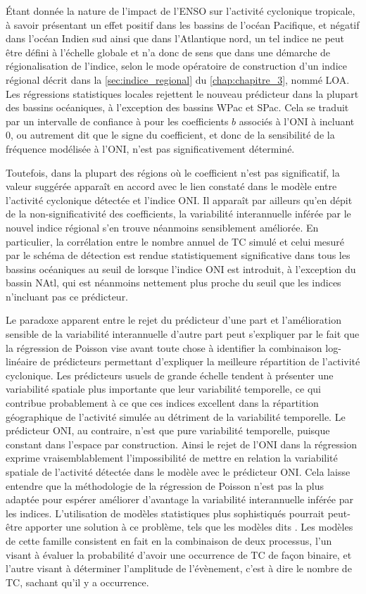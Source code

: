 \documentclass[../main.tex]{subfiles}
\begin{document}
Étant donnée la nature de l'impact de l'ENSO sur l'activité cyclonique tropicale, à savoir présentant un effet positif dans les bassins de l'océan Pacifique, et
négatif dans l'océan Indien sud ainsi que dans l'Atlantique nord, un tel indice ne peut être défini à l'échelle globale et n'a donc de sens que dans une
démarche de régionalisation de l'indice, selon le mode opératoire de construction d'un indice régional décrit dans la \cref{sec:indice_regional} du
\cref{chap:chapitre_3}, nommé LOA. Les régressions statistiques locales rejettent le nouveau prédicteur dans la plupart des bassins océaniques, à l'exception
des bassins WPac et SPac. Cela se traduit par un intervalle de confiance à  pour les coefficients $b$ associés à l'ONI à incluant \num{0}, ou autrement
dit que le signe du coefficient, et donc de la sensibilité de la fréquence modélisée à l'ONI, n'est pas significativement déterminé.

Toutefois, dans la plupart des régions où le coefficient n'est pas significatif, la valeur suggérée apparaît en accord avec le lien constaté dans le modèle
entre l'activité cyclonique détectée et l'indice ONI. Il apparaît par ailleurs qu'en dépit de la non-significativité des coefficients, la variabilité
interannuelle inférée par le nouvel indice régional s'en trouve néanmoins sensiblement améliorée. En particulier, la corrélation entre le nombre annuel de TC
simulé et celui mesuré par le schéma de détection est rendue statistiquement significative dans tous les bassins océaniques au seuil de  lorsque
l'indice ONI est introduit, à l'exception du bassin NAtl, qui est néanmoins nettement plus proche du seuil que les indices n'incluant pas ce prédicteur.

Le paradoxe apparent entre le rejet du prédicteur d'une part et l'amélioration sensible de la variabilité interannuelle d'autre part peut s'expliquer par le
fait que la régression de Poisson vise avant toute chose à identifier la combinaison log-linéaire de prédicteurs permettant d'expliquer la meilleure répartition
de l'activité cyclonique. Les prédicteurs usuels de grande échelle tendent à présenter une variabilité spatiale plus importante que leur variabilité temporelle,
ce qui contribue probablement à ce que ces indices excellent dans la répartition géographique de l'activité simulée au détriment de la variabilité temporelle.
Le prédicteur ONI, au contraire, n'est que pure variabilité temporelle, puisque constant dans l'espace par construction. Ainsi le rejet de l'ONI dans la
régression exprime vraisemblablement l'impossibilité de mettre en relation la variabilité spatiale de l'activité détectée dans le modèle avec le prédicteur ONI.
Cela laisse entendre que la méthodologie de la régression de Poisson n'est pas la plus adaptée pour espérer améliorer d'avantage la variabilité interannuelle
inférée par les indices. L'utilisation de modèles statistiques plus sophistiqués pourrait peut-être apporter une solution à ce problème, tels que les modèles
dits . Les modèles de cette famille consistent en fait en la combinaison de deux processus, l'un visant à évaluer la probabilité d'avoir une
occurrence de TC de façon binaire, et l'autre visant à déterminer l'amplitude de l'évènement, c'est à dire le nombre de TC, sachant qu'il y a occurrence.
\end{document}
